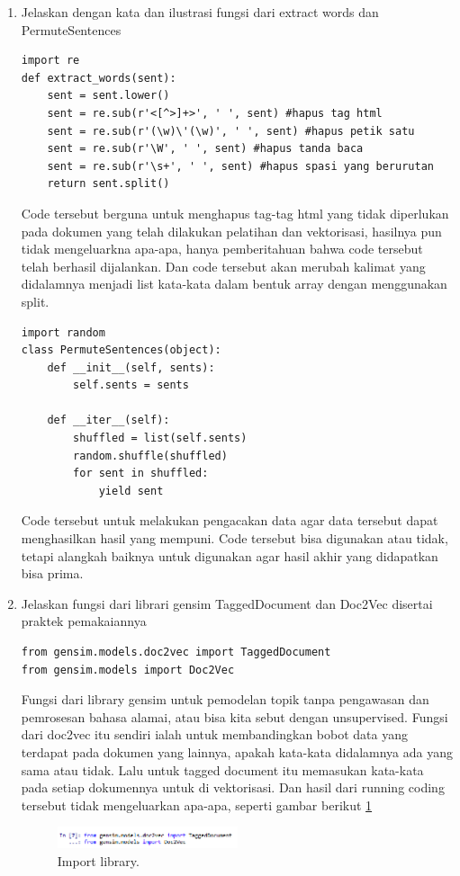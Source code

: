 \begin{enumerate}
\item Jelaskan dengan kata dan ilustrasi fungsi dari extract words dan PermuteSentences
\begin{verbatim}
import re
def extract_words(sent):
    sent = sent.lower()
    sent = re.sub(r'<[^>]+>', ' ', sent) #hapus tag html
    sent = re.sub(r'(\w)\'(\w)', ' ', sent) #hapus petik satu
    sent = re.sub(r'\W', ' ', sent) #hapus tanda baca
    sent = re.sub(r'\s+', ' ', sent) #hapus spasi yang berurutan
    return sent.split()
\end{verbatim}
Code tersebut berguna untuk menghapus tag-tag html yang tidak diperlukan pada dokumen yang telah dilakukan pelatihan dan vektorisasi, hasilnya pun tidak mengeluarkna apa-apa, hanya pemberitahuan bahwa code tersebut telah berhasil dijalankan. Dan code tersebut akan merubah kalimat yang didalamnya menjadi list kata-kata dalam bentuk array dengan menggunakan split.

\begin{verbatim}
import random
class PermuteSentences(object):
    def __init__(self, sents):
        self.sents = sents
        
    def __iter__(self):
        shuffled = list(self.sents)
        random.shuffle(shuffled)
        for sent in shuffled:
            yield sent
\end{verbatim}
Code tersebut untuk melakukan pengacakan data agar data tersebut dapat menghasilkan hasil yang mempuni. Code tersebut bisa digunakan atau tidak, tetapi alangkah baiknya untuk digunakan agar hasil akhir yang didapatkan bisa prima.

\item Jelaskan fungsi dari librari gensim TaggedDocument dan Doc2Vec disertai praktek pemakaiannya
\begin{verbatim}
from gensim.models.doc2vec import TaggedDocument
from gensim.models import Doc2Vec
\end{verbatim}
Fungsi dari library gensim untuk pemodelan topik tanpa pengawasan dan pemrosesan bahasa alamai, atau bisa kita sebut dengan unsupervised. Fungsi dari doc2vec itu sendiri ialah untuk membandingkan bobot data yang terdapat pada dokumen yang lainnya, apakah kata-kata didalamnya ada yang sama atau tidak. Lalu untuk tagged document itu memasukan kata-kata pada setiap dokumennya untuk di vektorisasi. Dan hasil dari running coding tersebut tidak mengeluarkan apa-apa, seperti gambar berikut \ref{sim8}
		\begin{figure}[!htbp]
		\centerline{\includegraphics[width=0.5\textwidth]{figures/im/sim8.png}}
		\caption{Import library.}
		\label{sim8}
		\end{figure}


\end{enumerate}
